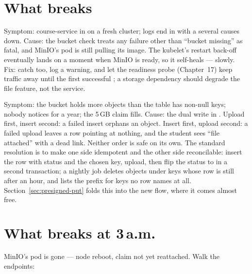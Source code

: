 \section{What breaks}

\begin{pitfall}
Symptom: course-service in  on a fresh cluster;
logs end in  with
a  several causes down. Cause: the
 bucket check treats any failure other than
``bucket missing'' as fatal, and MinIO's pod is still pulling its image.
The kubelet's restart back-off eventually lands on a moment when MinIO
is ready, so it self-heals --- slowly. Fix: catch
 too, log a warning, and let the readiness
probe (Chapter~17) keep traffic away until the first successful
; a storage dependency should degrade the file feature,
not the service.
\end{pitfall}

\begin{pitfall}[orphans]
Symptom: the bucket holds more objects than the  table
has non-null keys; nobody notices for a year; the 5\,GB claim fills.
Cause: the dual write in . Upload first, insert second: a
failed insert orphans an object. Insert first, upload second: a failed
upload leaves a row pointing at nothing, and the student sees ``file
attached'' with a dead link. Neither order is safe on its own. The
standard resolution is to make one side idempotent and the other side
reconcilable: insert the row with status  and the
chosen key, upload, then flip the status to  in a second
transaction; a nightly job deletes objects under keys whose row is still
 after an hour, and lists the prefix for keys no row
names at all. Section~\ref{sec:presigned-put} folds this into the new
flow, where it comes almost free.
\end{pitfall}

\section{What breaks at 3\,a.m.}

MinIO's pod is gone --- node reboot, claim not yet reattached. Walk the
endpoints:

